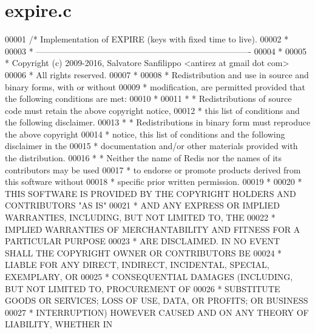 \hypertarget{expire_8c_source}{}\section{expire.\+c}
\label{expire_8c_source}

\begin{DoxyCode}
00001 \textcolor{comment}{/* Implementation of EXPIRE (keys with fixed time to live).}
00002 \textcolor{comment}{ *}
00003 \textcolor{comment}{ * ----------------------------------------------------------------------------}
00004 \textcolor{comment}{ *}
00005 \textcolor{comment}{ * Copyright (c) 2009-2016, Salvatore Sanfilippo <antirez at gmail dot com>}
00006 \textcolor{comment}{ * All rights reserved.}
00007 \textcolor{comment}{ *}
00008 \textcolor{comment}{ * Redistribution and use in source and binary forms, with or without}
00009 \textcolor{comment}{ * modification, are permitted provided that the following conditions are met:}
00010 \textcolor{comment}{ *}
00011 \textcolor{comment}{ *   * Redistributions of source code must retain the above copyright notice,}
00012 \textcolor{comment}{ *     this list of conditions and the following disclaimer.}
00013 \textcolor{comment}{ *   * Redistributions in binary form must reproduce the above copyright}
00014 \textcolor{comment}{ *     notice, this list of conditions and the following disclaimer in the}
00015 \textcolor{comment}{ *     documentation and/or other materials provided with the distribution.}
00016 \textcolor{comment}{ *   * Neither the name of Redis nor the names of its contributors may be used}
00017 \textcolor{comment}{ *     to endorse or promote products derived from this software without}
00018 \textcolor{comment}{ *     specific prior written permission.}
00019 \textcolor{comment}{ *}
00020 \textcolor{comment}{ * THIS SOFTWARE IS PROVIDED BY THE COPYRIGHT HOLDERS AND CONTRIBUTORS "AS IS"}
00021 \textcolor{comment}{ * AND ANY EXPRESS OR IMPLIED WARRANTIES, INCLUDING, BUT NOT LIMITED TO, THE}
00022 \textcolor{comment}{ * IMPLIED WARRANTIES OF MERCHANTABILITY AND FITNESS FOR A PARTICULAR PURPOSE}
00023 \textcolor{comment}{ * ARE DISCLAIMED. IN NO EVENT SHALL THE COPYRIGHT OWNER OR CONTRIBUTORS BE}
00024 \textcolor{comment}{ * LIABLE FOR ANY DIRECT, INDIRECT, INCIDENTAL, SPECIAL, EXEMPLARY, OR}
00025 \textcolor{comment}{ * CONSEQUENTIAL DAMAGES (INCLUDING, BUT NOT LIMITED TO, PROCUREMENT OF}
00026 \textcolor{comment}{ * SUBSTITUTE GOODS OR SERVICES; LOSS OF USE, DATA, OR PROFITS; OR BUSINESS}
00027 \textcolor{comment}{ * INTERRUPTION) HOWEVER CAUSED AND ON ANY THEORY OF LIABILITY, WHETHER IN}

\end{DoxyCode}
